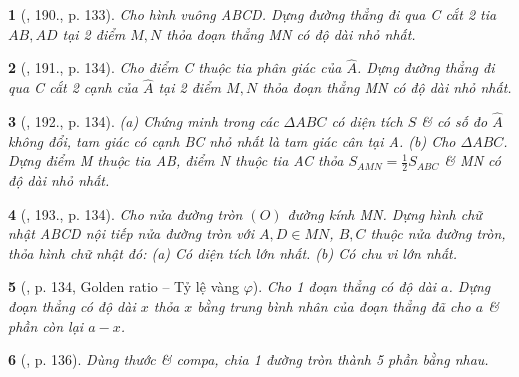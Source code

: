 \documentclass{article}
\newtheorem{baitoan}{}
\begin{document}
\begin{baitoan}[\cite{Binh_Toan_9_tap_1}, 190., p. 133]
	Cho hình vuông ABCD. Dựng đường thẳng đi qua C cắt 2 tia $AB,AD$ tại 2 điểm $M,N$ thỏa đoạn thẳng MN có độ dài nhỏ nhất.
\end{baitoan}

\begin{baitoan}[\cite{Binh_Toan_9_tap_1}, 191., p. 134]
	Cho điểm C thuộc tia phân giác của $\widehat{A}$. Dựng đường thẳng đi qua C cắt 2 cạnh của $\widehat{A}$ tại 2 điểm $M,N$ thỏa đoạn thẳng MN có độ dài nhỏ nhất.
\end{baitoan}

\begin{baitoan}[\cite{Binh_Toan_9_tap_1}, 192., p. 134]
	(a) Chứng minh trong các $\Delta ABC$ có diện tích $S$ \& có số đo $\widehat{A}$ không đổi, tam giác có cạnh BC nhỏ nhất là tam giác cân tại A. (b) Cho $\Delta ABC$. Dựng điểm M thuộc tia AB, điểm N thuộc tia AC thỏa $S_{AMN} = \frac{1}{2}S_{ABC}$  \& MN có độ dài nhỏ nhất.
\end{baitoan}

\begin{baitoan}[\cite{Binh_Toan_9_tap_1}, 193., p. 134]
	Cho nửa đường tròn $(O)$ đường kính MN. Dựng hình chữ nhật ABCD nội tiếp nửa đường tròn với $A,D\in MN$, $B,C$ thuộc nửa đường tròn, thỏa hình chữ nhật đó: (a) Có diện tích lớn nhất. (b) Có chu vi lớn nhất.
\end{baitoan}

\begin{baitoan}[\cite{Binh_Toan_9_tap_1}, p. 134, Golden ratio -- Tỷ lệ vàng $\varphi$]
	Cho 1 đoạn thẳng có độ dài $a$. Dựng đoạn thẳng có độ dài $x$ thỏa $x$ bằng trung bình nhân của đoạn thẳng đã cho $a$ \& phần còn lại $a - x$.
\end{baitoan}

\begin{baitoan}[\cite{Binh_Toan_9_tap_1}, p. 136]
	Dùng thước \& compa, chia 1 đường tròn thành 5 phần bằng nhau.
\end{baitoan}

\end{document}
